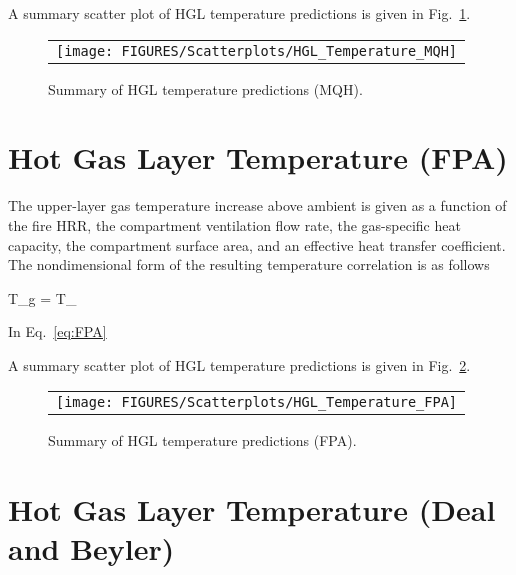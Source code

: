 \clearpage

A summary scatter plot of HGL temperature predictions is given in Fig.~\ref{hgl_temperature_MQH_summary}. 

\begin{figure}[ht]
\begin{center}
\begin{tabular}{l}
\texttt{[image: FIGURES/Scatterplots/HGL\_Temperature\_MQH]}
\end{tabular}
\end{center}
\caption[Summary of HGL temperature predictions (MQH).]
{Summary of HGL temperature predictions (MQH).}
\label{hgl_temperature_MQH_summary}
\end{figure}


\clearpage


\section{Hot Gas Layer Temperature (FPA)}

The upper-layer gas temperature increase above ambient is given as a function of the fire HRR, the compartment ventilation flow rate, the gas-specific heat capacity, the compartment surface area, and an effective heat transfer coefficient. The nondimensional form of the resulting temperature correlation is as follows

\be
\Delta T_g =  T_\infty
\label{eq:FPA}
\ee

In Eq.~\ref{eq:FPA}

\clearpage

A summary scatter plot of HGL temperature predictions is given in Fig.~\ref{hgl_temperature_FPA_summary}. 

\begin{figure}[ht]
\begin{center}
\begin{tabular}{l}
\texttt{[image: FIGURES/Scatterplots/HGL\_Temperature\_FPA]}
\end{tabular}
\end{center}
\caption[Summary of HGL temperature predictions (FPA).]
{Summary of HGL temperature predictions (FPA).}
\label{hgl_temperature_FPA_summary}
\end{figure}


\clearpage


\section{Hot Gas Layer Temperature (Deal and Beyler)}

